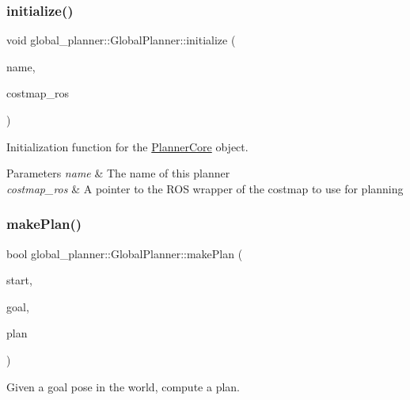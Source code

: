 \subsubsection{\texorpdfstring{initialize()}{initialize()}}
{\footnotesize\ttfamily void global\+\_\+planner\+::\+Global\+Planner\+::initialize (\begin{DoxyParamCaption}\item[{std\+::string}]{name,  }\item[{costmap\+\_\+2d\+::\+Costmap2\+D\+R\+OS $\ast$}]{costmap\+\_\+ros }\end{DoxyParamCaption})}



Initialization function for the \mbox{\hyperlink{class_planner_core}{Planner\+Core}} object. 


\begin{DoxyParams}{Parameters}
{\em name} & The name of this planner \\
\hline
{\em costmap\+\_\+ros} & A pointer to the R\+OS wrapper of the costmap to use for planning \\
\hline
\end{DoxyParams}
\mbox{\label{classglobal__planner_1_1_global_planner_abb7f40f6a851f88e6b7668a38571712a}} 
\subsubsection{\texorpdfstring{make\+Plan()}{makePlan()}\hspace{0.1cm}{\footnotesize\ttfamily [1/2]}}
{\footnotesize\ttfamily bool global\+\_\+planner\+::\+Global\+Planner\+::make\+Plan (\begin{DoxyParamCaption}\item[{const geometry\+\_\+msgs\+::\+Pose\+Stamped \&}]{start,  }\item[{const geometry\+\_\+msgs\+::\+Pose\+Stamped \&}]{goal,  }\item[{std\+::vector$<$ geometry\+\_\+msgs\+::\+Pose\+Stamped $>$ \&}]{plan }\end{DoxyParamCaption})}



Given a goal pose in the world, compute a plan. 


